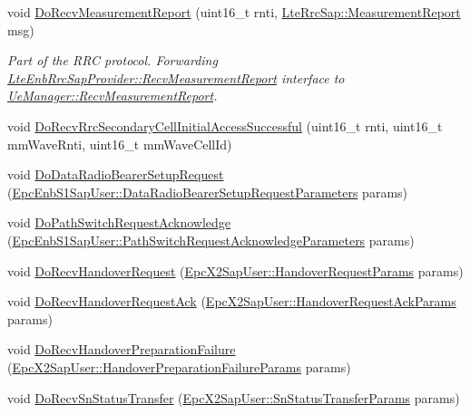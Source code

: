 \begin{DoxyCompactItemize}
void \hyperlink{classns3_1_1LteEnbRrc_a433972776d2b321dd83a3e5c94be7002}{Do\+Recv\+Measurement\+Report} (uint16\+\_\+t rnti, \hyperlink{structns3_1_1LteRrcSap_1_1MeasurementReport}{Lte\+Rrc\+Sap\+::\+Measurement\+Report} msg)
\begin{DoxyCompactList}\small\item\em Part of the R\+RC protocol. Forwarding \hyperlink{classns3_1_1LteEnbRrcSapProvider_abf788b7395d6a2bc7e0ab86a3f992695}{Lte\+Enb\+Rrc\+Sap\+Provider\+::\+Recv\+Measurement\+Report} interface to \hyperlink{classns3_1_1UeManager_aaf0bb6b60d798db37cefb97f4b1884e6}{Ue\+Manager\+::\+Recv\+Measurement\+Report}. \end{DoxyCompactList}\item 
void \hyperlink{classns3_1_1LteEnbRrc_ae6bc0498d03b3f204657037faa6581bb}{Do\+Recv\+Rrc\+Secondary\+Cell\+Initial\+Access\+Successful} (uint16\+\_\+t rnti, uint16\+\_\+t mm\+Wave\+Rnti, uint16\+\_\+t mm\+Wave\+Cell\+Id)
\item 
void \hyperlink{classns3_1_1LteEnbRrc_aec504e23b4981dbd0cf99fb55012322b}{Do\+Data\+Radio\+Bearer\+Setup\+Request} (\hyperlink{structns3_1_1EpcEnbS1SapUser_1_1DataRadioBearerSetupRequestParameters}{Epc\+Enb\+S1\+Sap\+User\+::\+Data\+Radio\+Bearer\+Setup\+Request\+Parameters} params)
\item 
void \hyperlink{classns3_1_1LteEnbRrc_a6e0fa9675862b025049ef08d9dcf3282}{Do\+Path\+Switch\+Request\+Acknowledge} (\hyperlink{structns3_1_1EpcEnbS1SapUser_1_1PathSwitchRequestAcknowledgeParameters}{Epc\+Enb\+S1\+Sap\+User\+::\+Path\+Switch\+Request\+Acknowledge\+Parameters} params)
\item 
void \hyperlink{classns3_1_1LteEnbRrc_a26c697a526a9538f8778481f7cf08906}{Do\+Recv\+Handover\+Request} (\hyperlink{structns3_1_1EpcX2Sap_1_1HandoverRequestParams}{Epc\+X2\+Sap\+User\+::\+Handover\+Request\+Params} params)
\item 
void \hyperlink{classns3_1_1LteEnbRrc_a4c1952a043aeb77e79ac2b73b2f86662}{Do\+Recv\+Handover\+Request\+Ack} (\hyperlink{structns3_1_1EpcX2Sap_1_1HandoverRequestAckParams}{Epc\+X2\+Sap\+User\+::\+Handover\+Request\+Ack\+Params} params)
\item 
void \hyperlink{classns3_1_1LteEnbRrc_aa58714c1ca8f2d8a55709aa62fe9a3c3}{Do\+Recv\+Handover\+Preparation\+Failure} (\hyperlink{structns3_1_1EpcX2Sap_1_1HandoverPreparationFailureParams}{Epc\+X2\+Sap\+User\+::\+Handover\+Preparation\+Failure\+Params} params)
\item 
void \hyperlink{classns3_1_1LteEnbRrc_a262e99f877e578fb806fcf4df3f75f5d}{Do\+Recv\+Sn\+Status\+Transfer} (\hyperlink{structns3_1_1EpcX2Sap_1_1SnStatusTransferParams}{Epc\+X2\+Sap\+User\+::\+Sn\+Status\+Transfer\+Params} params)

\end{DoxyCompactItemize}
